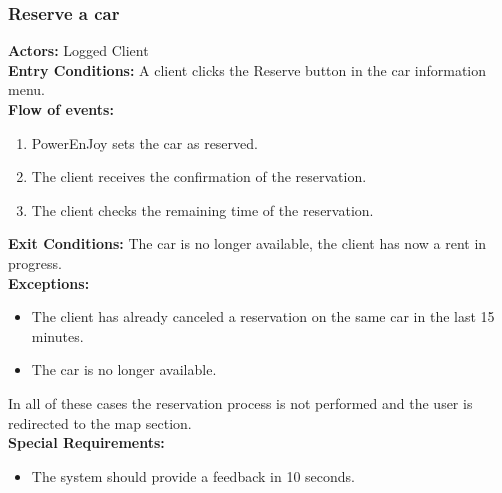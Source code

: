 \subsubsection{Reserve a car}
%
\textbf{Actors:}
Logged Client\\
%
\textbf{Entry Conditions:}
A client clicks the Reserve button in the car information menu.\\
%
\textbf{Flow of events:}
\begin{enumerate}
\item PowerEnJoy sets the car as reserved.
\item The client receives the confirmation of the reservation.
\item The client checks the remaining time of the reservation.  
\end{enumerate}
%
\textbf{Exit Conditions:}
The car is no longer available, the client has now a rent in progress.\\
%
\textbf{Exceptions:}
\begin{itemize}
\item The client has already canceled a reservation on the same car in the last 15 minutes. 
\item The car is no longer available.
\end{itemize}
In all of these cases the reservation process is not performed and the user is redirected to the map section. \\
%
\textbf{Special Requirements:}
\begin{itemize}
\item The system should provide a feedback in 10 seconds.
\end{itemize}


